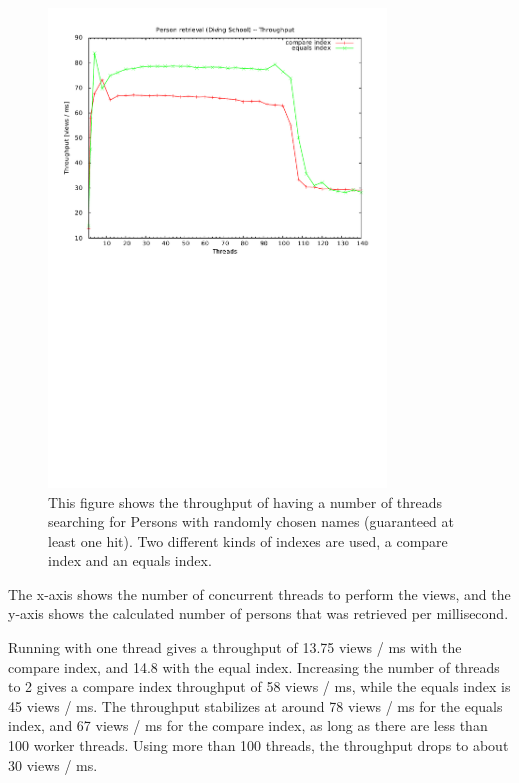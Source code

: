 \begin{figure}[h!]
\centering
\includegraphics[width = 0.8\textwidth, trim = 0 15cm 0 1cm]{img/retrievalDvuThroughput.pdf}
\caption{This figure shows the throughput of having a number of threads searching for Persons with randomly chosen names (guaranteed at least one hit). Two different kinds of indexes are used, a compare index and an equals index.}
\label{fig:retrievalDvuThroughput}
\end{figure}

The x-axis shows the number of concurrent threads to perform the views,
and the y-axis shows the calculated number of persons that was retrieved
per millisecond.

Running with one thread gives a throughput of 13.75 views / ms with
the compare index, and 14.8 with the equal index. Increasing the number
of threads to 2 gives a compare index throughput of 58 views / ms,
while the equals index is 45 views / ms. The throughput stabilizes
at around 78 views / ms for the equals index, and 67 views / ms for
the compare index, as long as there are less than 100 worker threads.
Using more than 100 threads, the throughput drops to about 30 views
/ ms.


